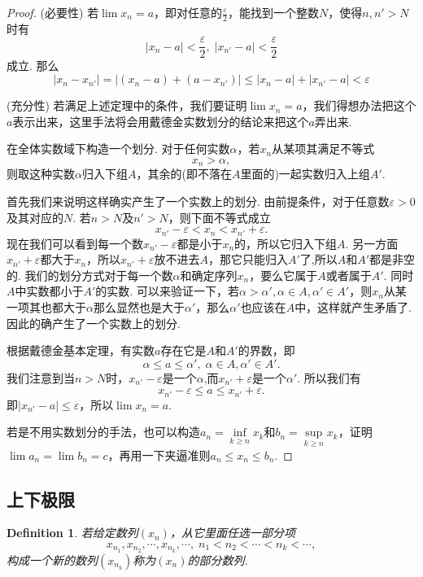 \documentclass{article}
\newtheorem{definition}[theorem]{Definition}
\begin{document}
\begin{proof}
{\color{red} (必要性)} 若$\lim x_n = a$，即对任意的$\frac{\varepsilon}{2}$，能找到一个整数$N$，使得$n, n' > N$时有
$$
|x_n - a| < \frac{\varepsilon}{2},\; |x_{n'} - a| < \frac{\varepsilon}{2}
$$
成立. 那么
$$
|x_n - x_{n'}| = |(x_n -a ) + (a - x_{n'})| \leq |x_n-a| + |x_{n'}-a| < \varepsilon
$$

{\color{red} (充分性)} 若满足上述定理中的条件，{\color{blue}我们要证明$\lim x_n = a$，我们得想办法把这个$a$表示出来，这里手法将会用戴德金实数划分的结论来把这个$a$弄出来}.

在全体实数域下构造一个划分. 对于任何实数$\alpha$，若$x_n$从某项其满足不等式\[x_n > \alpha,\]则取这种实数$\alpha$归入下组$A$，其余的(即不落在$A$里面的)一起实数归入上组$A'$.

首先我们来说明这样确实产生了一个实数上的划分. 由前提条件，对于任意数$\varepsilon>0$及其对应的$N$. 若$n > N$及$n' > N$，则下面不等式成立\[x_{n'} - \varepsilon < x_n < x_{n'}+\varepsilon.\]现在我们可以看到每一个数$x_{n'} - \varepsilon$都是小于$x_n$的，所以它归入下组$A$. 另一方面$x_{n'}+\varepsilon$都大于$x_n$，所以$x_{n'}+\varepsilon$放不进去$A$，那它只能归入$A'$了,所以$A$和$A'$都是非空的. 我们的划分方式对于每一个数$\alpha$和确定序列$x_n$，要么它属于$A$或者属于$A'$. 同时$A$中实数都小于$A'$的实数. 可以来验证一下，若$\alpha > \alpha', \alpha \in A , \alpha' \in A'$，则$x_n$从某一项其也都大于$\alpha$那么显然也是大于$\alpha'$，那么$\alpha'$也应该在$A$中，这样就产生矛盾了. 因此的确产生了一个实数上的划分.

根据戴德金基本定理，有实数$a$存在它是$A$和$A'$的界数，即\[\alpha \leq a \leq \alpha', \; \alpha \in A,\alpha' \in A'.\]我们注意到当$n > N$时，$x_{n'} - \varepsilon$是一个$\alpha$,而$x_{n'} +\varepsilon$是一个$\alpha'$. 所以我们有\[x_{n'} - \varepsilon \leq a \leq x_{n'} + \varepsilon.\]即$|x_{n'}-a| \leq \varepsilon$，所以$\lim x_n = a$.

{\color{blue} 若是不用实数划分的手法，也可以构造$a_n = \inf\limits_{k \geq n} x_k$和$b_n=\sup\limits_{k \geq n} x_k$，证明$\lim a_n = \lim b_n = c$，再用一下夹逼准则$a_n \leq x_n \leq b_n$.}
\end{proof}

\subsection{上下极限}

\begin{definition}
\rm 若给定数列$(x_n)$，从它里面任选一部分项
$$
x_{n_1},x_{n_2},\cdots,x_{n_k},\cdots,\; n_1 < n_2 < \cdots < n_k < \cdots,
$$
构成一个新的数列$(x_{n_k})$称为$(x_n)$的部分数列.
\end{definition}
\end{document}
